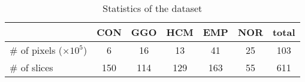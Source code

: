\begin{table}[htbp]
  \begin{center}
    \caption{Statistics of the dataset}
    \begin{tabular}{lcccccc}
      \toprule
      \multicolumn{1}{c}{} & CON & GGO & HCM & EMP & NOR & total \\
      \midrule
      \# of pixels ($\times10^5$)& 6 & 16 & 13 & 41 & 25 & 103 \\
      \# of slices & 150 & 114 & 129 & 163 & 55 & 611 \\
      \bottomrule
    \end{tabular}
    \label{dataset_stats}
  \end{center}
\end{table}
